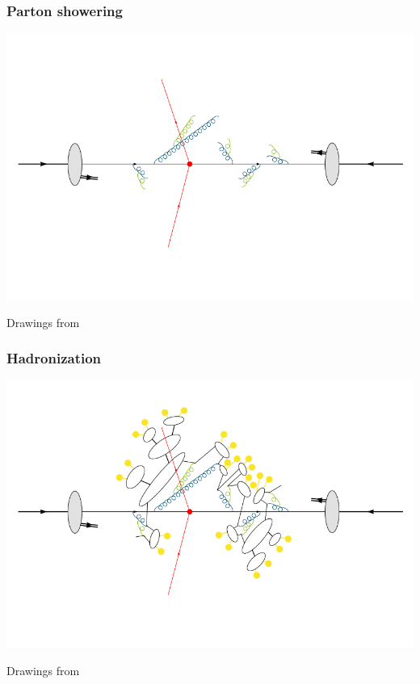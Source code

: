 \documentclass[xcolor=dvipsnames,10pt]{beamer}
\begin{document}
\begin{frame}\frametitle{Parton showering}
\centering\myskip
\includegraphics[height=0.8\textheight]{../montecarlo/figures/event4}

\begin{flushright}\tiny Drawings from~\cite{Gieseke}\end{flushright}

\end{frame}

\begin{frame}\frametitle{Hadronization}
\centering\myskip
\includegraphics[height=0.8\textheight]{../montecarlo/figures/event5}

\begin{flushright}\tiny Drawings from~\cite{Gieseke}\end{flushright}

\end{frame}
\end{document}
